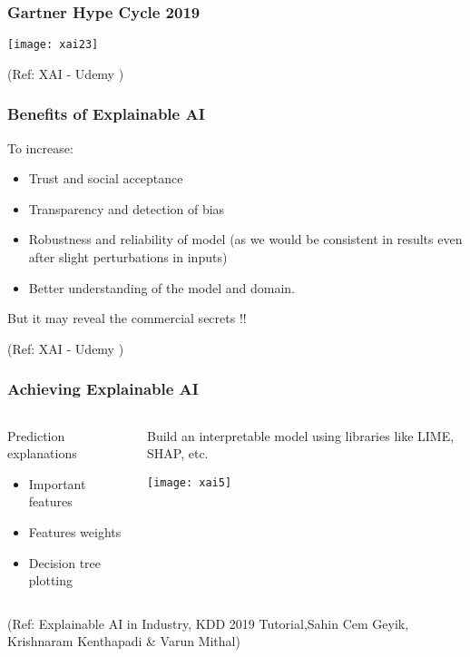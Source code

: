 \begin{frame}[fragile]\frametitle{Gartner Hype Cycle 2019}

\begin{center}
\texttt{[image: xai23]}
\end{center}


\tiny{(Ref: XAI - Udemy  )}

\end{frame}

\begin{frame}[fragile]\frametitle{Benefits of Explainable AI}
To increase:
\begin{itemize}
\item Trust and social acceptance
\item Transparency and detection of bias
\item Robustness and reliability of model (as we would be consistent in results even after slight perturbations in inputs)
\item Better understanding of the model and domain.
\end{itemize}

But it may reveal the commercial secrets !!

\tiny{(Ref: XAI - Udemy  )}

\end{frame}

\begin{frame}[fragile]\frametitle{Achieving Explainable AI}
\begin{columns}
    \begin{column}[T]{0.6\linewidth}
		Prediction explanations

				\begin{itemize}
				\item Important features
				\item Features weights
				\item Decision tree plotting
				\end{itemize}
				
    \end{column}
    \begin{column}[T]{0.4\linewidth}
		Build an interpretable model using libraries like LIME, SHAP, etc.

      \begin{center}
      \texttt{[image: xai5]}
	  	\end{center}
    \end{column}
  \end{columns}
  
\tiny{(Ref: Explainable AI in Industry, KDD 2019 Tutorial,Sahin Cem Geyik, Krishnaram Kenthapadi \& Varun Mithal)}
\end{frame}


